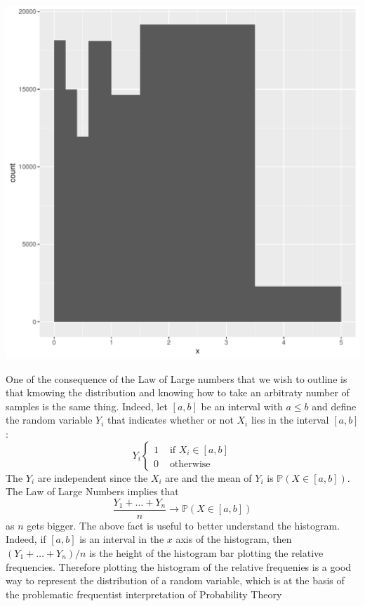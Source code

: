 \begin{knitrout}
\includegraphics[width=\maxwidth]{images/statistics//histogram_frequencies-1} 
\end{knitrout}

	One of the consequence of the Law of Large numbers that we wish to outline is that kmowing the distribution and knowing how to take an arbitraty number of samples is the same thing. Indeed, let $[a,b]$ be an interval with $a \leq b$ and define the random variable $Y_i$ that indicates whether or not $X_i$ lies in the interval $[a,b]$: 
		\begin{equation}
			\label{e:indicator}
			Y_i
			\begin{cases}
				1 & \text{ if } X_i \in [a,b]\\
				0 & \text{ otherwise }
			\end{cases}
		\end{equation}
		The $Y_i$ are independent since the $X_i$ are and the mean of $Y_i$ is $\mathbb P( X \in [a,b])$. The Law of Large Numbers implies that 
		\begin{equation}
			\label{e:sample=distr}
			\frac{Y_1 + \ldots + Y_n}{n} \to \mathbb P(X \in [a,b])
		\end{equation}
		as $n$ gets bigger. 
		The above fact is useful to better understand the histogram. Indeed, if $[a,b]$ is an interval in the $x$ axis of the histogram, then $(Y_1 + \ldots + Y_n)/n$ is the height of the histogram bar plotting the relative frequencies. Therefore plotting the histogram of the relative frequenies is a good way to represent the distribution of a random variable, which is at the basis of the problematic frequentist interpretation of Probability Theory

